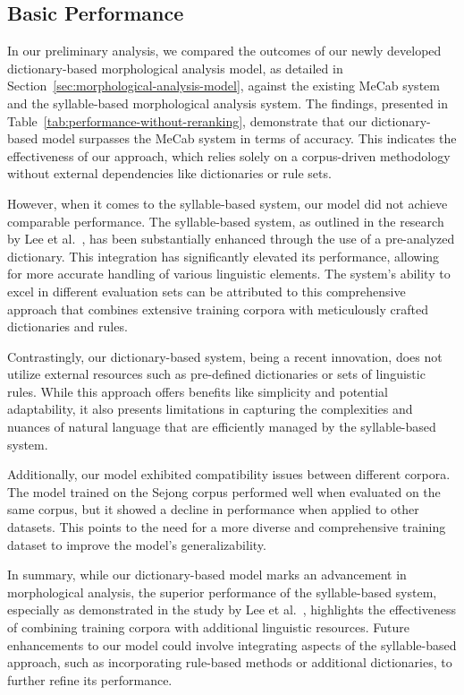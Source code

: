 \documentclass[AMS,STIX2COL]{WileyNJD-v2}
\begin{document}
    \subsection{Basic Performance}\label{subsec:basic-performance}

    In our preliminary analysis, we compared the outcomes of our newly developed dictionary-based morphological analysis model, as detailed in Section~\ref{sec:morphological-analysis-model}, against the existing MeCab system and the syllable-based morphological analysis system.
    The findings, presented in Table~\ref{tab:performance-without-reranking}, demonstrate that our dictionary-based model surpasses the MeCab system in terms of accuracy.
    This indicates the effectiveness of our approach, which relies solely on a corpus-driven methodology without external dependencies like dictionaries or rule sets.

    However, when it comes to the syllable-based system, our model did not achieve comparable performance.
    The syllable-based system, as outlined in the research by Lee et al.~\cite{LeeCH2016}, has been substantially enhanced through the use of a pre-analyzed dictionary.
    This integration has significantly elevated its performance, allowing for more accurate handling of various linguistic elements.
    The system's ability to excel in different evaluation sets can be attributed to this comprehensive approach that combines extensive training corpora with meticulously crafted dictionaries and rules.

    Contrastingly, our dictionary-based system, being a recent innovation, does not utilize external resources such as pre-defined dictionaries or sets of linguistic rules.
    While this approach offers benefits like simplicity and potential adaptability, it also presents limitations in capturing the complexities and nuances of natural language that are efficiently managed by the syllable-based system.

    Additionally, our model exhibited compatibility issues between different corpora.
    The model trained on the Sejong corpus performed well when evaluated on the same corpus, but it showed a decline in performance when applied to other datasets.
    This points to the need for a more diverse and comprehensive training dataset to improve the model's generalizability.

    In summary, while our dictionary-based model marks an advancement in morphological analysis, the superior performance of the syllable-based system, especially as demonstrated in the study by Lee et al.~\cite{LeeCH2016}, highlights the effectiveness of combining training corpora with additional linguistic resources.
    Future enhancements to our model could involve integrating aspects of the syllable-based approach, such as incorporating rule-based methods or additional dictionaries, to further refine its performance.
\end{document}
